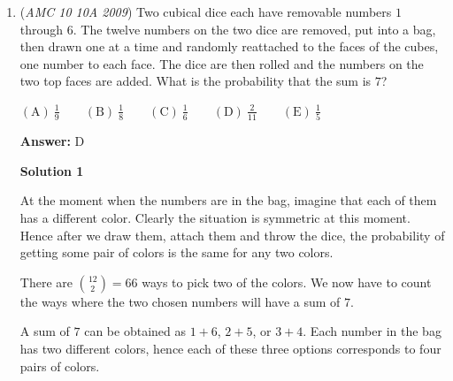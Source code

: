 \begin{enumerate}
 Simplifying, we have that 
 \begin{align*} \frac{4 \cdot \left(\pi \cdot 1^2 \right)}{\pi \cdot (1+\sqrt{2})^2} &= \frac{4 \cdot \pi}{\pi \cdot (1 + \sqrt{2})^2} \\ &= \frac{\pi \cdot 4}{\pi \cdot (1+\sqrt{2})^2} \\ &= \frac{4}{(1+\sqrt{2})^2} \\ &= \frac{4}{1^2 + 2 \cdot 1 \cdot \sqrt{2} + (\sqrt{2})^2} \\ &= \frac{4}{1 + 2 \sqrt{2} + 2} \\ &= \frac{4}{3 + 2 \sqrt{2}} \\ &= \frac{4 (3 - 2\sqrt{2})}{(3 + 2 \sqrt{2})(3 - 2\sqrt{2})} \\ &= \frac{4 (3 - 2\sqrt{2})}{3^2 - (2\sqrt{2})^2} \\ &= \frac{4 (3 - 2\sqrt{2})}{9 - 8} \\ &= \frac{4 (3 - 2\sqrt{2})}{1} \\ &= \boxed{\textbf{(C) } 4 (3 - 2\sqrt{2})} \end{align*}




	\item (\textit{AMC 10 10A 2009}) Two cubical dice each have removable numbers $1$ through $6$. The twelve numbers on the two dice are removed, put into a bag, then drawn one at a time and randomly reattached to the faces of the cubes, one number to each face. The dice are then rolled and the numbers on the two top faces are added. What is the probability that the sum is $7$?


 $\mathrm{(A)}\ \frac{1}{9} \qquad \mathrm{(B)}\ \frac{1}{8} \qquad \mathrm{(C)}\ \frac{1}{6} \qquad \mathrm{(D)}\ \frac{2}{11} \qquad \mathrm{(E)}\ \frac{1}{5}$

 \textbf{Answer: }D



\textbf{Solution 1}

At the moment when the numbers are in the bag, imagine that each of them has a different color. Clearly the situation is symmetric at this moment. Hence after we draw them, attach them and throw the dice, the probability of getting some pair of colors is the same for any two colors.

 There are ${12 \choose 2} = 66$ ways to pick two of the colors. We now have to count the ways where the two chosen numbers will have a sum of $7$. 

 A sum of $7$ can be obtained as $1+6$, $2+5$, or $3+4$. Each number in the bag has two different colors, hence each of these three options corresponds to four pairs of colors. 


\end{enumerate}
